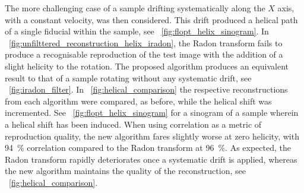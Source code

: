\documentclass[times, twoside, watermark]{zHenriquesLab-StyleBioRxiv}
\begin{document}

The more challenging case of a sample drifting systematically along the \(X\) axis, with a constant velocity, was then considered. This drift produced a helical path of a single fiducial within the sample, see \figurename~\ref{fig:flopt_helix_sinogram}.
In \figurename~\ref{fig:unfilttered_reconstruction_helix_iradon}, the \gls*{Radon transform} fails to produce a recognisable reproduction of the test image with the addition of a slight helicity to the rotation.
The proposed algorithm produces an equivalent result to that of a sample rotating without any systematic drift, see \figurename~\ref{fig:iradon_filter}.
In \figurename~\ref{fig:helical_comparison} the respective reconstructions from each algorithm were compared, as before, while the helical shift was incremented.
See \figurename~\ref{fig:flopt_helix_sinogram} for a sinogram of a sample wherein a helical shift has been induced.
When using correlation as a metric of reproduction quality, the new algorithm fares slightly worse at zero helicity, with \SI{94}{\percent} correlation compared to the \gls*{Radon transform} at \SI{96}{\percent}.
As expected, the \gls*{Radon transform} rapidly deteriorates once a systematic drift is applied, whereas the new algorithm maintains the quality of the reconstruction, see \figurename~\ref{fig:helical_comparison}.
\end{document}

